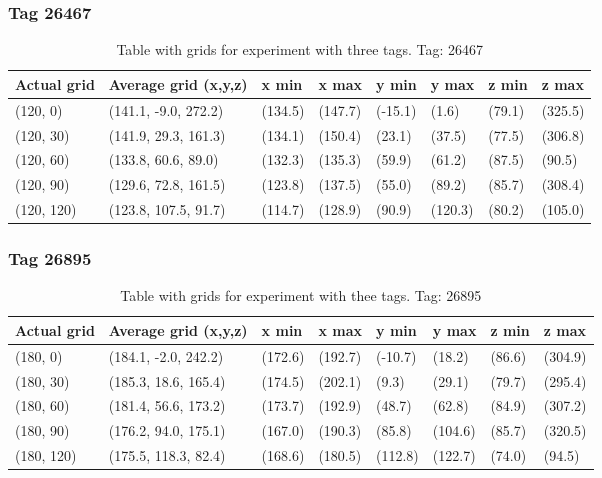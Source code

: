 \subsubsection{Tag 26467}
\begin{table}[H] 
    \begin{tabular}{|l|l|l|l|l|l|l|l|}
    \hline
    Actual grid & Average grid (x,y,z)   & x min   & x max   & y min    & y max   & z min   & z max    \\ \hline
    (120, 0)     & (141.1, -9.0, 272.2)      & (134.5)     & (147.7)    & (-15.1)     & (1.6)      & (79.1)     & (325.5)     \\ \hline
    (120, 30)     & (141.9, 29.3, 161.3)      & (134.1)     & (150.4)    & (23.1)     & (37.5)      & (77.5)     & (306.8)     \\ \hline
    (120, 60)     & (133.8, 60.6, 89.0)      & (132.3)     & (135.3)    & (59.9)     & (61.2)      & (87.5)     & (90.5)     \\ \hline
    (120, 90)     & (129.6, 72.8, 161.5)      & (123.8)     & (137.5)    & (55.0)     & (89.2)      & (85.7)     & (308.4)     \\ \hline
    (120, 120)     & (123.8, 107.5, 91.7)      & (114.7)     & (128.9)    & (90.9)     & (120.3)      & (80.2)     & (105.0)     \\ \hline
\end{tabular}
\label{Tab:three-tag-experiment-result-tag-26467}
\caption{Table with grids for experiment with three tags. Tag: 26467}
\end{table}
\subsubsection{Tag 26895}
\begin{table}[H] 
    \begin{tabular}{|l|l|l|l|l|l|l|l|}
    \hline
    Actual grid & Average grid (x,y,z)   & x min   & x max   & y min    & y max   & z min   & z max    \\ \hline
    (180, 0)     & (184.1, -2.0, 242.2)      & (172.6)     & (192.7)    & (-10.7)     & (18.2)      & (86.6)     & (304.9)    \\ \hline
    (180, 30)     & (185.3, 18.6, 165.4)      & (174.5)     & (202.1)    & (9.3)     & (29.1)      & (79.7)     & (295.4)    \\ \hline
    (180, 60)     & (181.4, 56.6, 173.2)      & (173.7)     & (192.9)    & (48.7)     & (62.8)      & (84.9)     & (307.2)    \\ \hline
    (180, 90)     & (176.2, 94.0, 175.1)      & (167.0)     & (190.3)    & (85.8)     & (104.6)      & (85.7)     & (320.5)    \\ \hline
    (180, 120)     & (175.5, 118.3, 82.4)      & (168.6)     & (180.5)    & (112.8)     & (122.7)      & (74.0)     & (94.5)    \\ \hline
\end{tabular}
\label{Tab:three-tag-experiment-result-tag-26895}
\caption{Table with grids for experiment with thee tags. Tag: 26895}
\end{table}

